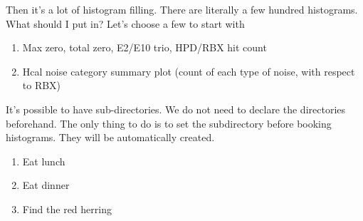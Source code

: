 Then it's a lot of histogram filling.
There are literally a few hundred histograms.  What should I put in?
Let's choose a few to start with

\begin{enumerate}
\item Max zero, total zero, E2/E10 trio, HPD/RBX hit count
\item Hcal noise category summary plot (count of each type of noise, with respect to RBX)
\end{enumerate}


It's possible to have sub-directories.  We do not need to declare the directories beforehand.
The only thing to do is to set the subdirectory before booking histograms.  They will be automatically created.



\begin{enumerate}
\item Eat lunch
\item Eat dinner
\item Find the red herring
\end{enumerate}


